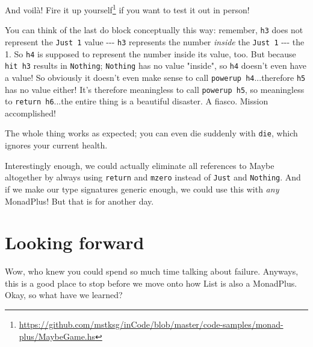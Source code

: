 \documentclass[]{article}
\renewcommand{\href}[2]{#2\footnote{\url{#1}}}
\begin{document}
And voilà!
\href{https://github.com/mstksg/inCode/blob/master/code-samples/monad-plus/MaybeGame.hs}{Fire
it up yourself} if you want to test it out in person!

You can think of the last do block conceptually this way: remember, \texttt{h3}
does not represent the \texttt{Just\ 1} value -\/-\/- \texttt{h3} represents the
number \emph{inside} the \texttt{Just\ 1} -\/-\/- the 1. So \texttt{h4} is
supposed to represent the number inside its value, too. But because
\texttt{hit\ h3} results in \texttt{Nothing}; \texttt{Nothing} has no value
"inside", so \texttt{h4} doesn't even have a value! So obviously it doesn't even
make sense to call \texttt{powerup\ h4}...therefore \texttt{h5} has no value
either! It's therefore meaningless to call \texttt{powerup\ h5}, so meaningless
to \texttt{return\ h6}...the entire thing is a beautiful disaster. A fiasco.
Mission accomplished!

The whole thing works as expected; you can even die suddenly with \texttt{die},
which ignores your current health.

Interestingly enough, we could actually eliminate all references to Maybe
altogether by always using \texttt{return} and \texttt{mzero} instead of
\texttt{Just} and \texttt{Nothing}. And if we make our type signatures generic
enough, we could use this with \emph{any} MonadPlus! But that is for another
day.

\section{Looking forward}

Wow, who knew you could spend so much time talking about failure. Anyways, this
is a good place to stop before we move onto how List is also a MonadPlus. Okay,
so what have we learned?
\end{document}
